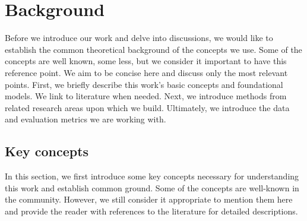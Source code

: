 \chapter{Background}%
\label{chap:background}
Before we introduce our work and delve into discussions, we would like to establish the common theoretical background of the concepts we use.
Some of the concepts are well known, some less, but we consider it important to have this reference point.
We aim to be concise here and discuss only the most relevant points.
First, we briefly describe this work's basic concepts and foundational models.
We link to literature when needed.
Next, we introduce methods from related research areas upon which we build.
Ultimately, we introduce the data and evaluation metrics we are working with.

\section{Key concepts}
\label{02:sec:basics}
In this section, we first introduce some key concepts necessary for understanding this work and establish common ground.
Some of the concepts are well-known in the community.
However, we still consider it appropriate to mention them here and provide the reader with references to the literature for detailed descriptions.

